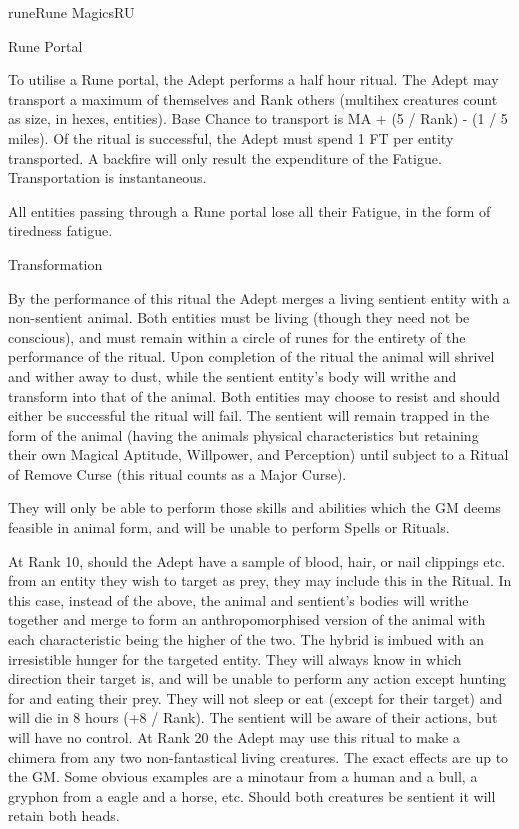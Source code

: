 \begin{College}[2.2]{rune}{Rune Magics}{RU}
\begin{ritual}[R-6]{Rune Portal}
\begin{effects}
To utilise a Rune portal, the Adept performs a half hour ritual.  The
Adept may transport a maximum of themselves and Rank others (multihex
creatures count as size, in hexes, entities).  Base Chance to
transport is MA + (5 / Rank) - (1 / 5 miles). Of the ritual is
successful, the Adept must spend 1 FT per entity transported.  A
backfire will only result the expenditure of the Fatigue.
Transportation is instantaneous.

All entities passing through a Rune portal lose all their Fatigue, in
the form of tiredness fatigue.
\end{effects}
\end{ritual}

\begin{ritual}[R-7]{Transformation}

\begin{effects}
By the performance of this ritual the Adept merges a living sentient
entity with a non-sentient animal.  Both entities must be living
(though they need not be conscious), and must remain within a circle
of runes for the entirety of the performance of the ritual.  Upon
completion of the ritual the animal will shrivel and wither away to
dust, while the sentient entity’s body will writhe and transform into
that of the animal. Both entities may choose to resist and should
either be successful the ritual will fail. The sentient will remain
trapped in the form of the animal (having the animals physical
characteristics but retaining their own Magical Aptitude, Willpower,
and Perception) until subject to a Ritual of Remove Curse (this ritual
counts as a Major Curse).

They will only be able to perform those skills and abilities which the
GM deems feasible in animal form, and will be unable to perform Spells
or Rituals.

At Rank 10, should the Adept have a sample of blood, hair, or nail
clippings etc.  from an entity they wish to target as prey, they may
include this in the Ritual.  In this case, instead of the above, the
animal and sentient’s bodies will writhe together and merge to form an
anthropomorphised version of the animal with each characteristic being
the higher of the two.  The hybrid is imbued with an irresistible
hunger for the targeted entity.  They will always know in which
direction their target is, and will be unable to perform any action
except hunting for and eating their prey. They will not sleep or eat
(except for their target) and will die in 8 hours (+8 / Rank).  The
sentient will be aware of their actions, but will have no control.  At
Rank 20 the Adept may use this ritual to make a chimera from any two
non-fantastical living creatures. The exact effects are up to the GM.
Some obvious examples are a minotaur from a human and a bull, a
gryphon from a eagle and a horse, etc.  Should both creatures be
sentient it will retain both heads.
\end{effects}
\end{ritual}

\end{College}
